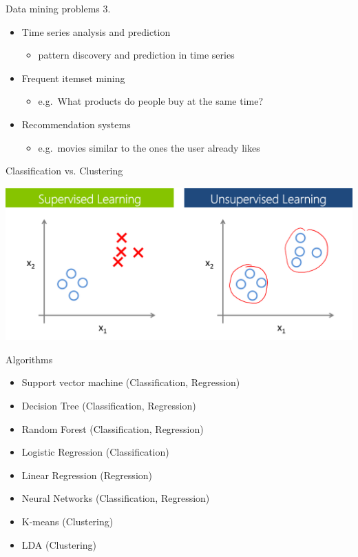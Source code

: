 \documentclass[bigger]{beamer}
\begin{document}
\begin{frame}{Data mining problems 3.}
    \begin{itemize}
        \item Time series analysis and prediction
            \begin{itemize}
                \item pattern discovery and prediction in time series
            \end{itemize}
        \item Frequent itemset mining
            \begin{itemize}
                \item e.g.~What products do people buy at the same time?
            \end{itemize}
        \item Recommendation systems
            \begin{itemize}
                \item e.g.~movies similar to the ones the user already likes
            \end{itemize}
    \end{itemize}
\end{frame}


\begin{frame}{Classification vs. Clustering}
    \begin{center}
        \includegraphics[width=.8\textwidth]{fig/sup_unsup.png}
    \end{center}
\end{frame}

\begin{frame}{Algorithms}
	\begin{itemize}
		\item Support vector machine (Classification, Regression)
		\item Decision Tree (Classification, Regression)
		\item Random Forest (Classification, Regression)
		\item Logistic Regression (Classification)
		\item Linear Regression (Regression)
		\item Neural Networks (Classification, Regression)
		\item K-means (Clustering)
		\item LDA (Clustering)
	\end{itemize}
\end{frame}
\end{document}
